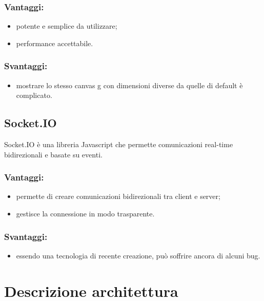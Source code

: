 \documentclass[a4paper, titlepage]{article}
\begin{document}
\subsubsection{Vantaggi:}

\begin{itemize}
	\item potente e semplice da utilizzare;
	\item performance accettabile.
\end{itemize}

\subsubsection{Svantaggi:}
\begin{itemize}
	\item mostrare lo stesso canvas g con dimensioni diverse da quelle di default è complicato.
\end{itemize}



\subsection{Socket.IO}
Socket.IO è una libreria Javascript che permette comunicazioni real-time bidirezionali e basate su eventi.

\subsubsection{Vantaggi:}

\begin{itemize}
	\item permette di creare comunicazioni bidirezionali tra client e server;
	\item gestisce la connessione in modo trasparente.
\end{itemize}

\subsubsection{Svantaggi:}

\begin{itemize}
	\item essendo una tecnologia di recente creazione, può soffrire ancora di alcuni bug.
\end{itemize}

\newpage
	\section{Descrizione architettura}
\end{document}
